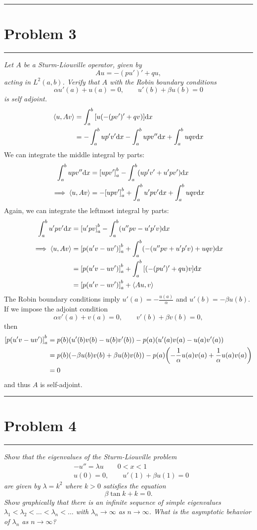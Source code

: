 \documentclass{article} %
\theoremstyle{plain}
\newcommand{\problem}[1]{
\vspace{.375cm}
\begin{minipage}{\textwidth}
    \begin{center}
        \noindent\rule{5cm}{1pt}
    \end{center}
    \section{\bf #1}
    \begin{center}
        \noindent\rule{5cm}{1pt}
    \end{center}
    \vspace{0.25cm}
\end{minipage}
}
\newcommand{\VEC}[2]{\left\langle #1, #2 \right\rangle}
\begin{document}
\problem{Problem 3}
\emph{Let $A$ be a Sturm-Liouville operator, given by $$Au = -(pu')' + qu,$$ acting in $L^2(a,b)$.  Verify that $A$ with the Robin boundary conditions $$\alpha u'(a) + u(a) = 0, \qquad u'(b) + \beta u(b) = 0$$ is self adjoint.}
\begin{align*}
    \VEC{u}{Av} &= \int_a^b \qty[u\qty(-(pv')' + qv)]\dd x \\
    &= -\int_a^b u p' v' \dd x - \int_a^b u p v'' \dd x + \int_a^b u q v \dd x
\end{align*}
We can integrate the middle integral by parts:
\begin{align*}
    \int_a^b u p v'' \dd x &= \qty[u p v']_a^b - \int_a^b (u p' v' + u' p v') \dd x \\
    \implies \VEC{u}{Av} &= -\qty[upv']_a^b + \int_a^b u' p v'\dd x + \int_a^b u q v \dd x \\
\end{align*}
Again, we can integrate the leftmost integral by parts:
\begin{align*}
    \int_a^b u' p v'\dd x &= \qty[u' p v]_a^b - \int_a^b (u'' p v - u' p' v) \dd x \\
    \implies \VEC{u}{Av} &= \qty[p(u'v - uv')]_a^b + \int_a^b (-(u'' p v + u' p' v) + u q v) \dd x \\
    &= \qty[p(u'v - uv')]_a^b + \int_a^b \qty[\qty(-(pu')' + qu)v]\dd x \\
    &= \qty[p(u'v - uv')]_a^b + \VEC{Au}{v}
\end{align*}
The Robin boundary conditions imply $u'(a) = -\frac{u(a)}{\alpha}$ and $u'(b) = -\beta u(b)$.  If we impose the adjoint condition $$\alpha v'(a) + v(a) = 0, \qquad v'(b) + \beta v(b) = 0,$$ then
\begin{align*}
    \qty[p(u'v - uv')]_a^b &= p(b)\qty(u'(b)v(b) - u(b)v'(b)) - p(a)\qty(u'(a)v(a) - u(a)v'(a)) \\
    &= p(b)\qty(-\beta u(b)v(b) + \beta u(b)v(b)) - p(a)\qty(-\frac{1}{\alpha}u(a)v(a) + \frac{1}{\alpha}u(a)v(a)) \\
    &= 0
\end{align*}
and thus $A$ is self-adjoint.

\problem{Problem 4}
\emph{Show that the eigenvalues of the Sturm-Liouville problem}
\begin{align*}
    &-u'' = \lambda u \qquad 0 < x < 1 \\ &u(0) = 0, \qquad u'(1) + \beta u(1) = 0
\end{align*}
\emph{are given by $\lambda = k^2$ where $k > 0$ satisfies the equation $$ \beta \tan k + k = 0.$$  Show graphically that there is an infinite sequence of simple eigenvalues $\lambda_1 < \lambda_2 < \dots < \lambda_n < \dots$ with $\lambda_n \rightarrow \infty$ as $n \rightarrow \infty$.  What is the asymptotic behavior of $\lambda_n$ as $n \rightarrow \infty$?} \\
\end{document}
